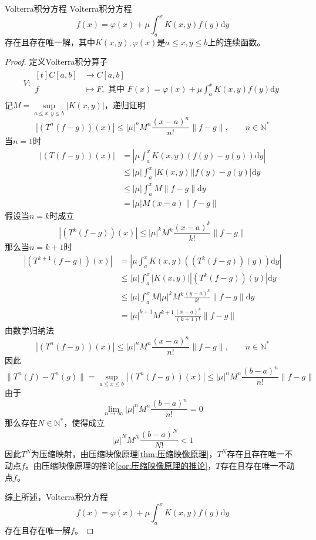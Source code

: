 \documentclass[lang = cn, scheme = chinese, thmcnt = section]{elegantbook}
\newcommand{\N}{\mathbb{N}}            %
\begin{document}
\begin{proposition}{Volterra积分方程}
	Volterra积分方程
	$$
	f(x)=\varphi(x)+\mu\int_a^xK(x,y)f(y)\mathrm{d}y
	$$
	存在且存在唯一解，其中$K(x,y),\varphi(x)$是$a\le x,y\le b$上的连续函数。
\end{proposition}

\begin{proof}
	定义Volterra积分算子
	\begin{align*}
		V:\begin{aligned}[t]
			C[a,b]&\longrightarrow C[a,b]\\
			f&\longmapsto F,\text{ 其中 }F(x)=\varphi(x)+\mu\int_a^xK(x,y)f(y)\mathrm{d}y
		\end{aligned}
	\end{align*}
	记$M=\sup\limits_{a\le x,y\le b}|K(x,y)|$，递归证明
	$$
	|(T^n(f-g))(x)|
	\le |\mu|^nM^n\frac{(x-a)^n}{n!}\|f-g\|,\qquad n\in\N^*
	$$
	当$n=1$时
	\begin{align*}
		|(T(f-g))(x)|
		& = \left| \mu\int_a^xK(x,y)(f(y)-g(y))\mathrm{d}y \right|\\
		& \le |\mu|\int_a^x|K(x,y)||f(y)-g(y)|\mathrm{d}y\\
		& \le |\mu|\int_a^xM\|f-g\|\mathrm{d}y\\
		& = |\mu|M(x-a)\|f-g\|
	\end{align*}
	假设当$n=k$时成立
	$$
	|(T^k(f-g))(x)|
	\le |\mu|^kM^k\frac{(x-a)^k}{k!}\|f-g\|
	$$
	那么当$n=k+1$时
	\begin{align*}
		|(T^{k+1}(f-g))(x)|
		& = \left| \mu\int_a^x K(x,y)((T^k(f-g))(y)) \mathrm{d}y\right|\\
		& \le |\mu|\int_a^x|K(x,y)||(T^k(f-g))(y)|\mathrm{d}y\\
		& \le |\mu|\int_a^xM|\mu|^kM^k\frac{(y-a)^k}{k!}\|f-g\|\mathrm{d}y\\
		& = |\mu|^{k+1}M^{k+1}\frac{(x-a)^k}{({k+1})!}\|f-g\|
	\end{align*}
	由数学归纳法
	$$
	|(T^n(f-g))(x)|
	\le |\mu|^nM^n\frac{(x-a)^n}{n!}\|f-g\|,\qquad n\in\N^*
	$$
	因此
	$$
	\|T^n(f)-T^n(g)\|
	=\sup_{a\le x\le b}|(T^n(f-g))(x)|
	\le |\mu|^nM^n\frac{(b-a)^n}{n!}\|f-g\|
	$$
	由于
	$$
	\lim_{n\to\infty}|\mu|^nM^n\frac{(b-a)^n}{n!}=0
	$$
	那么存在$N\in\N^*$，使得成立
	$$
	|\mu|^NM^N\frac{(b-a)^N}{N!}<1
	$$
	因此$T^N$为压缩映射，由压缩映像原理\ref{thm:压缩映像原理}，$T^N$存在且存在唯一不动点$f$。由压缩映像原理的推论\ref{cor:压缩映像原理的推论}，$T$存在且存在唯一不动点$f$。
	
	综上所述，Volterra积分方程
	$$
	f(x)=\varphi(x)+\mu\int_a^xK(x,y)f(y)\mathrm{d}y
	$$
	存在且存在唯一解$f$。
\end{proof}
\end{document}
